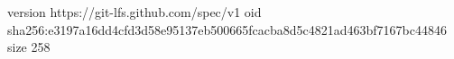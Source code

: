 version https://git-lfs.github.com/spec/v1
oid sha256:e3197a16dd4cfd3d58e95137eb500665fcacba8d5c4821ad463bf7167bc44846
size 258
